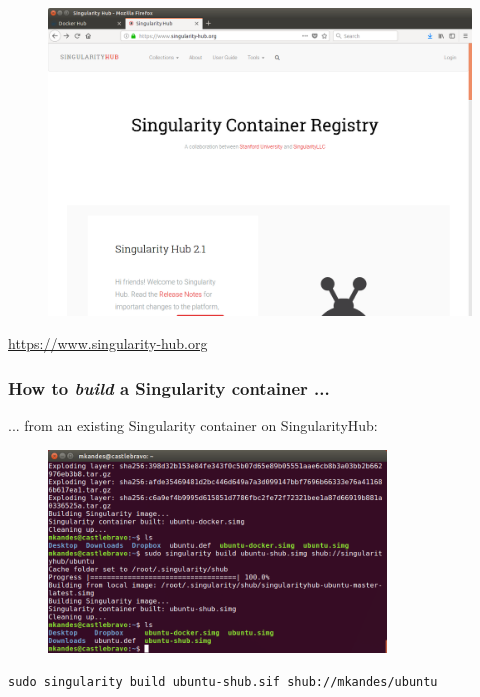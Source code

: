 \documentclass{beamer}
\begin{document}
\begin{frame}
   \frametitle{}
   \begin{figure}[htbp]
      \includegraphics[width=1.0\textwidth]{images/singularity-hub-homepage.png}
   \end{figure}
   \begin{center}
      \url{https://www.singularity-hub.org}
   \end{center}
\end{frame}

\begin{frame}
   \frametitle{How to \textit{build} a Singularity container ...}
   ... from an existing Singularity container on SingularityHub:
   \begin{figure}[htbp]
      \includegraphics[width=0.8\textwidth]{images/singularity-build-shub.png}
   \end{figure}
   \lstinline{sudo singularity build ubuntu-shub.sif shub://mkandes/ubuntu}
\end{frame}
\end{document}
